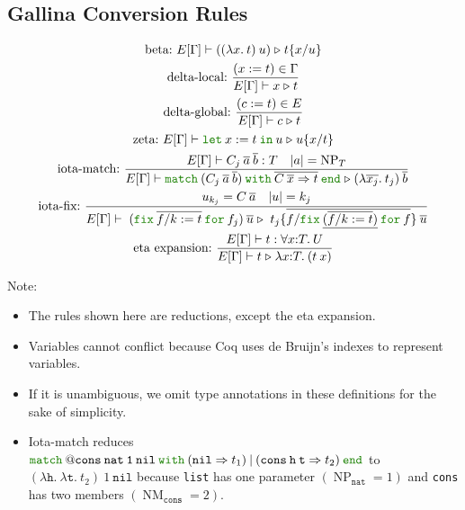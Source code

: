 \documentclass[a4paper,fleqn]{article}
\def\coq{\textrm{Coq}}
\def\gallina{\textrm{Gallina}}
\newcommand{\kwlet}{\mbox{\color{mygreen}\ttfamily let}}
\newcommand{\kwin}{\mbox{\color{mygreen}\ttfamily in}}
\newcommand{\kwmatch}{\mbox{\color{mygreen}\ttfamily match}}
\newcommand{\kwwith}{\mbox{\color{mygreen}\ttfamily with}}
\newcommand{\kwend}{\mbox{\color{mygreen}\ttfamily end}}
\newcommand{\kwfix}{\mbox{\color{mygreen}\ttfamily fix}}
\newcommand{\kwfor}{\mbox{\color{mygreen}\ttfamily for}}
\newcommand{\lam}[2]{\lambda #1.\:#2}
\newcommand{\lamT}[3]{\lambda #1\mathord{:}#2.\:#3}
\newcommand{\prodT}[3]{\forall #1\mathord{:}#2.\:#3}
\newcommand{\letin}[3]{\kwlet\:#1:=#2\:\kwin\:#3}
\newcommand{\omatch}[2]{\kwmatch\:#1\:\kwwith\:{#2}\:\kwend}
\newcommand{\ofix}[2]{\kwfix\:{#1}\:\kwfor\:{#2}}
\DeclareMathOperator{\NP}{NP} %
\DeclareMathOperator{\NM}{NM} %
\newcommand{\WT}[4]{\ensuremath{#1[#2] \vdash #3 : #4}}
\newcommand{\WTE}[3]{\WT{E}{#1}{#2}{#3}}
\newcommand{\WTEG}[2]{\WTE{\Gamma}{#1}{#2}}
\newcommand{\subst}[3]{#1\{#2/#3\}}
\newcommand{\substm}[3]{#1\{\overline{#2/#3}\}}
\newcommand{\reltri}{\mathrel{\triangleright}}
\newcommand{\rep}[1]{\overline{#1}}
\begin{document}

\subsection{\gallina{} Conversion Rules}\label{sec:conversion-rules}

\begin{gather*}
  \text{beta:}~
    E[\Gamma] \vdash ((\lam{x}{t})\:u) \reltri \subst{t}{x}{u} \\
  \text{delta-local:}~
    \dfrac{(x:=t) \in \Gamma}{E[\Gamma] \vdash x \reltri t} \\
  \text{delta-global:}~
    \dfrac{(c:=t) \in E}{E[\Gamma] \vdash c \reltri t} \\
  \text{zeta:}~
    E[\Gamma] \vdash \letin{x}{t}{u} \reltri \subst{u}{x}{t} \\
  \text{iota-match:}~
    \dfrac
    {
      E[\Gamma] \vdash C_j\:\rep{a}\:\rep{b} : T \quad
      \text{$|a| = \NP_T$}
    }{
      E[\Gamma] \vdash
      \omatch{(C_j\:\rep{a}\:\rep{b})}{\rep{C\:\rep{x}\Rightarrow t}}
      \reltri
      (\lam{\rep{x_j}}{t_j})\:\rep{b}
    } \\
  \text{iota-fix:}~
    \dfrac{
      u_{k_j} = C\:\rep{a} \quad
      |u| = k_j
    }{
      E[\Gamma] \vdash\; (\ofix{\rep{f/k:=t}}{f_j})\:\rep{u} \reltri\; \substm{t_j}{f}{\ofix{\underline{(\rep{f/k:=t})}}{f}} \: \rep{u}
    } \\
  \text{eta expansion:}~
    \dfrac{\WTEG{t}{\prodT{x}{T}{U}}}{E[\Gamma] \vdash t \reltri \lamT{x}{T}{(t\:x)}}
\end{gather*}
{\small Note:
\begin{itemize}
  \item The rules shown here are reductions, except the eta expansion.
  \item Variables cannot conflict because \coq{} uses de Bruijn's indexes to represent variables.
  \item If it is unambiguous, we omit type annotations in these definitions for the sake of simplicity.
  \item Iota-match reduces $\kwmatch\:\mathtt{@cons\:nat\:1\:nil}\:\kwwith\:(\mathtt{nil} \Rightarrow t_1)\:|\:(\mathtt{cons}\:\mathtt{h}\:\mathtt{t} \Rightarrow t_2)\:\kwend$ to $(\lam{\mathtt{h}}{\lam{\mathtt{t}}{t_2}})\:1\:\mathtt{nil}$
    because \lstinline!list! has one parameter $(\NP_\mathtt{nat}=1)$ and \lstinline!cons! has two members $(\NM_\mathtt{cons}=2)$.
\end{itemize}}
\end{document}

